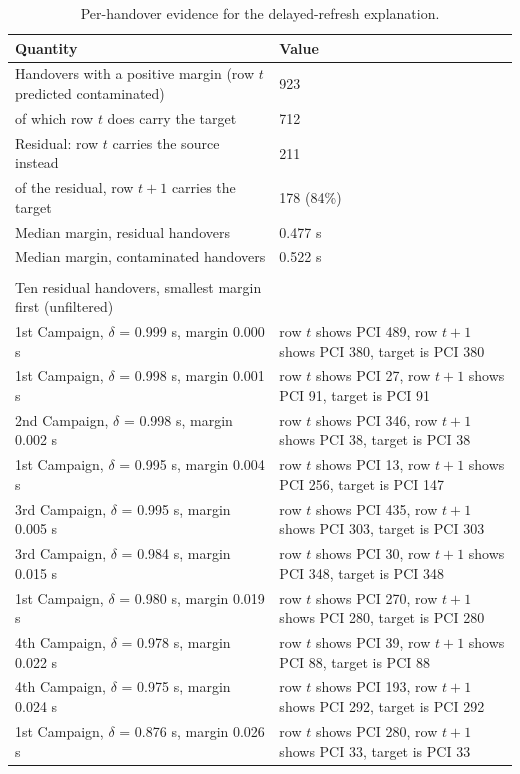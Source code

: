 \begin{table}[htbp]
\centering
\caption{Per-handover evidence for the delayed-refresh explanation.}
\label{tab:A_6}
\vspace{0.4em}
\singlespacing
\small
\begin{tabularx}{\linewidth}{p{4.0cm} X}
\toprule
\textbf{Quantity} & \textbf{Value} \\
\midrule
Handovers with a positive margin (row $t$ predicted contaminated) & 923 \\
of which row $t$ does carry the target & 712 \\
Residual: row $t$ carries the source instead & 211 \\
of the residual, row $t+1$ carries the target & 178 (84\%) \\
Median margin, residual handovers & 0.477 s \\
Median margin, contaminated handovers & 0.522 s \\
 &  \\
Ten residual handovers, smallest margin first (unfiltered) &  \\
1st Campaign, $\delta$ = 0.999 s, margin 0.000 s & row $t$ shows PCI 489, row $t+1$ shows PCI 380, target is PCI 380 \\
1st Campaign, $\delta$ = 0.998 s, margin 0.001 s & row $t$ shows PCI 27, row $t+1$ shows PCI 91, target is PCI 91 \\
2nd Campaign, $\delta$ = 0.998 s, margin 0.002 s & row $t$ shows PCI 346, row $t+1$ shows PCI 38, target is PCI 38 \\
1st Campaign, $\delta$ = 0.995 s, margin 0.004 s & row $t$ shows PCI 13, row $t+1$ shows PCI 256, target is PCI 147 \\
3rd Campaign, $\delta$ = 0.995 s, margin 0.005 s & row $t$ shows PCI 435, row $t+1$ shows PCI 303, target is PCI 303 \\
3rd Campaign, $\delta$ = 0.984 s, margin 0.015 s & row $t$ shows PCI 30, row $t+1$ shows PCI 348, target is PCI 348 \\
1st Campaign, $\delta$ = 0.980 s, margin 0.019 s & row $t$ shows PCI 270, row $t+1$ shows PCI 280, target is PCI 280 \\
4th Campaign, $\delta$ = 0.978 s, margin 0.022 s & row $t$ shows PCI 39, row $t+1$ shows PCI 88, target is PCI 88 \\
4th Campaign, $\delta$ = 0.975 s, margin 0.024 s & row $t$ shows PCI 193, row $t+1$ shows PCI 292, target is PCI 292 \\
1st Campaign, $\delta$ = 0.876 s, margin 0.026 s & row $t$ shows PCI 280, row $t+1$ shows PCI 33, target is PCI 33 \\
\bottomrule
\end{tabularx}
\end{table}

